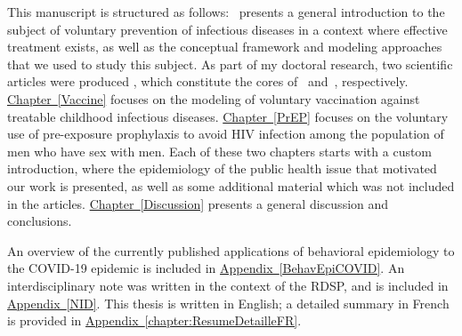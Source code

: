 This manuscript is structured as follows:~ presents a general introduction to the subject of voluntary prevention of infectious diseases in a context where effective treatment exists, as well as the conceptual framework and modeling approaches that we used to study this subject. As part of my doctoral research, two scientific articles were 
produced \cite[]{Jijon2017,Jijon2021}, which constitute the cores of~ and~, respectively. \hyperlink{Vaccine}{Chapter~\ref*{Vaccine}} focuses on the modeling of voluntary vaccination against treatable childhood infectious diseases. \hyperlink{PrEP}{Chapter~\ref*{PrEP}} focuses on the voluntary use of pre-exposure prophylaxis to avoid HIV infection among the population of men who have sex with men. Each of these two chapters starts with a custom introduction, where the epidemiology of the public health issue that motivated our work is presented, as well as some additional material which was not included in the articles. \hyperlink{Discussion}{Chapter~\ref*{Discussion}} presents a general discussion and conclusions. 

An overview of the currently published applications of behavioral epidemiology to the COVID-19 epidemic %
is included in \hyperlink{BehavEpiCOVID}{Appendix~\ref*{BehavEpiCOVID}}. An interdisciplinary note was written in the context of the RDSP, and is included in \hyperlink{NID}{Appendix~\ref*{NID}}. This thesis is written in English; a detailed summary in French is provided in \hyperlink{chapter:ResumeDetailleFR}{Appendix~\ref*{chapter:ResumeDetailleFR}}.